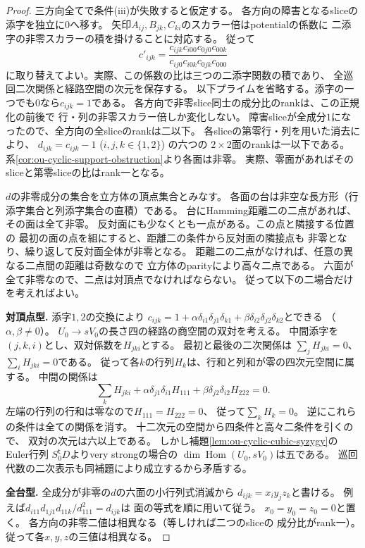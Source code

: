 \begin{proof}
三方向全てで条件(iii)が失敗すると仮定する。
各方向の障害となるsliceの添字を独立に$0$へ移す。
矢印$A_{ij},B_{jk},C_{ki}$のスカラー倍はpotentialの係数に
二添字の非零スカラーの積を掛けることに対応する。
従って
\[
 c'_{ijk}=
 \frac{c_{ijk}c_{i00}c_{0j0}c_{00k}}
 {c_{ij0}c_{i0k}c_{0jk}c_{000}}
\]
に取り替えてよい。実際、この係数の比は三つの二添字関数の積であり、
全巡回二次関係と経路空間の次元を保存する。
以下プライムを省略する。添字の一つでも$0$なら$c_{ijk}=1$である。
各方向で非零slice同士の成分比のrankは、この正規化の前後で
行・列の非零スカラー倍しか変化しない。
障害sliceが全成分$1$になったので、全方向の全sliceのrankは二以下。
各sliceの第零行・列を用いた消去により、
$d_{ijk}=c_{ijk}-1$ ($i,j,k\in\{1,2\}$) の六つの
$2\times2$面のrankは一以下である。
系\ref{cor:ou-cyclic-support-obstruction}より各面は非零。
実際、零面があればそのsliceと第零sliceの比はrank一となる。

$d$の非零成分の集合を立方体の頂点集合とみなす。
各面の台は非空な長方形（行添字集合と列添字集合の直積）である。
台にHamming距離二の二点があれば、その面は全て非零。
反対面にも少なくとも一点がある。この点と隣接する位置の
最初の面の点を組にすると、距離二の条件から反対面の隣接点も
非零となり、繰り返して反対面全体が非零となる。
距離二の二点がなければ、任意の異なる二点間の距離は奇数なので
立方体のparityにより高々二点である。
六面が全て非零なので、二点は対頂点でなければならない。
従って以下の二場合だけを考えればよい。

\smallskip
\noindent\textbf{対頂点型.}
添字$1,2$の交換により
$c_{ijk}=1+\alpha\delta_{i1}\delta_{j1}\delta_{k1}
+\beta\delta_{i2}\delta_{j2}\delta_{k2}$とできる
（$\alpha,\beta\ne0$）。
$U_0\to sV_0$の長さ四の経路の商空間の双対を考える。
中間添字を$(j,k,i)$とし、双対係数を$H_{jki}$とする。
最初と最後の二次関係は
$\sum_jH_{jki}=0$、$\sum_iH_{jki}=0$である。
従って各$k$の行列$H_k$は、行和と列和が零の四次元空間に属する。
中間の関係は
\[
 \sum_k H_{jki}
 +\alpha\delta_{j1}\delta_{i1}H_{111}
 +\beta\delta_{j2}\delta_{i2}H_{222}=0 .
\]
左端の行列の行和は零なので$H_{111}=H_{222}=0$、
従って$\sum_k H_k=0$。
逆にこれらの条件は全ての関係を消す。
十二次元の空間から四条件と高々二条件を引くので、
双対の次元は六以上である。
しかし補題\ref{lem:ou-cyclic-cubic-syzygy}のEuler行列
$S_0^{\mathsf t}D$よりvery strongの場合の
$\dim\operatorname{Hom}(U_0,sV_0)$は五である。
巡回代数の二次表示も同補題により成立するから矛盾する。

\smallskip
\noindent\textbf{全台型.}
全成分が非零の$d$の六面の小行列式消滅から
$d_{ijk}=x_i y_j z_k$と書ける。
例えば$d_{i11}d_{1j1}d_{11k}/d_{111}^2=d_{ijk}$は
面の等式を順に用いて従う。
$x_0=y_0=z_0=0$と置く。
各方向の非零二値は相異なる（等しければ二つのsliceの
成分比がrank一）。従って各$x,y,z$の三値は相異なる。


\end{proof}
